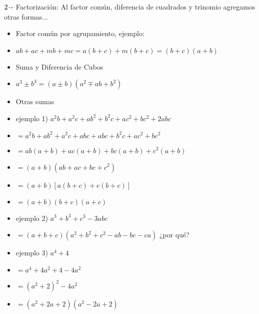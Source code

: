 $2\hspace{-0.05cm}\cdot\hspace{-0.05cm}\text{-}$ Factorización: Al factor común, diferencia de cuadrados y trinomio agregamos otras formas...
\begin{itemize}
    \def\labelitemi{-}
    \addtolength{\itemindent}{0.5cm}
    \item Factor común por agrupamiento, ejemplo: \vspace{-0.3cm}
    \item[] $ab + ac + mb + mc = a(b+c) + m(b+c) = (b+c)(a+b)$
    \item Suma y Diferencia de Cubos \vspace{-0.3cm}
    \item[] $a^3 \pm b^3 = (a \pm b)(a^2 \mp ab + b^2)$
    \item Otras sumas \vspace{-0.3cm}
    \item[] ejemplo 1) $a^2b + a^2c + ab^2 + b^2c + ac^2 + bc^2 + 2abc$ \vspace{-0.3cm}
    \item[] $= a^2b + ab^2 + a^2c + abc + abc + b^2c + ac^2 + bc^2$ \vspace{-0.3cm}
    \item[] $= ab(a+b) + ac(a+b) + bc(a+b) + c^2(a+b)$ \vspace{-0.3cm}
    \item[] $= (a+b)(ab + ac + bc + c^2)$ \vspace{-0.3cm}
    \item[] $= (a+b)[a(b+c) + c(b+c)]$ \vspace{-0.3cm}
    \item[] $= (a+b)(b+c)(a+c)$
    \item[] ejemplo 2) $a^3 + b^3 + c^3 - 3abc$ \vspace{-0.3cm}
    \item[] $= (a+b+c)(a^2+b^2+c^2-ab -bc- ca)$ ¿por qué?
    \item[] ejemplo 3) $a^4+4$ \vspace{-0.3cm}
    \item[] $= a^4 + 4a^2 + 4 - 4a^2$ \vspace{-0.3cm}
    \item[] $= (a^2 +2)^2 - 4a^2$ \vspace{-0.3cm}
    \item[] $= (a^2 + 2a + 2)(a^2 - 2a +2)$ \vspace{-0.3cm}
\end{itemize}

